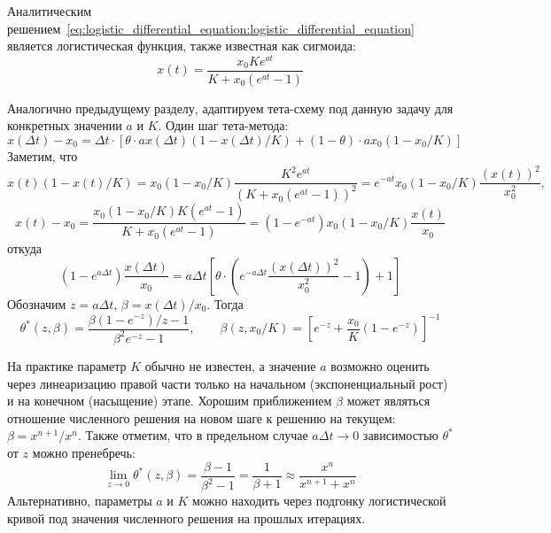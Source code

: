 Аналитическим решением~\eqref{eq:logistic_differential_equation:logistic_differential_equation}
является логистическая функция, также известная как сигмоида:
\begin{equation}
    \label{eq:logistic_differential_equation:logistic_function}
    x(t) = \frac{x_0 K e^{a t}}{K + x_0 (e^{a t} - 1)}
\end{equation}


Аналогично предыдущему разделу, адаптируем тета-схему под данную задачу для конкретных значении $ a $ и $ K $.
Один шаг тета-метода:
\[
    x(\Delta t) - x_0 = \Delta t \cdot \left[ \theta \cdot a x(\Delta t) (1 - x(\Delta t) / K) + (1 - \theta) \cdot a x_0 (1 - x_0 / K) \right]
\]
Заметим, что
\[
    x(t) (1 - x(t) / K) = x_0 (1 - x_0 / K) \frac{K^2 e^{a t}}{(K + x_0 (e^{a t} - 1))^2} = e^{-a t} x_0 (1 - x_0 / K) \frac{(x(t))^2}{x_0^2},
\]
\[
    x(t) - x_0 = \frac{x_0 (1 - x_0 / K) K (e^{a t} - 1)}{K + x_0 (e^{a t} - 1)} = (1 - e^{- a t}) x_0 (1 - x_0 / K) \frac{x(t)}{x_0}
\]
откуда
\[
    (1 - e^{a \Delta t}) \frac{x(\Delta t)}{x_0} =
    a \Delta t \left[ \theta \cdot \left( e^{- a \Delta t} \frac{(x(\Delta t))^2}{x_0^2}  - 1 \right) + 1 \right]
\]
Обозначим $ z = a \Delta t $, $ \beta = x(\Delta t) / x_0 $.
Тогда
\begin{equation}
    \label{eq:logistic_differential_equation:optimal_theta}
    \theta^*(z, \beta) = \frac{\beta (1 - e^{-z}) / z - 1}{\beta^2 e^{-z} - 1}, \qquad \beta(z, x_0/K) = \left[ e^{-z} + \frac{x_0}{K} (1 - e^{-z}) \right]^{-1}
\end{equation}

На практике параметр $ K $ обычно не известен,
а значение $ a $ возможно оценить через линеаризацию правой части только
на начальном (экспоненциальный рост) и на конечном (насыщение) этапе.
Хорошим приближением $ \beta $ может являться отношение численного решения на новом шаге
к решению на текущем: $ \beta = x^{n+1} / x^n $.
Также отметим, что в предельном случае $ a \Delta t \to 0 $ зависимостью $ \theta^* $ от $ z $ можно пренебречь:
\[
    \lim_{z \to 0} \theta^*(z, \beta) = \frac{\beta - 1}{\beta^2 - 1} = \frac{1}{\beta + 1} \approx \frac{x^n}{x^{n+1} + x^{n}}
\]
Альтернативно, параметры $ a $ и $ K $ можно находить через подгонку логистической кривой
под значения численного решения на прошлых итерациях.



